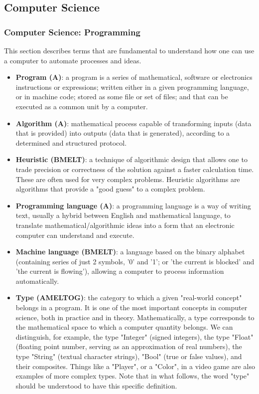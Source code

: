 \documentclass{article}
\begin{document}
\subsection*{Computer Science}

\subsubsection*{Computer Science: Programming}

This section describes terms that are fundamental to understand how one can use a computer to automate processes and ideas.

\begin{itemize}

	\item \textbf{Program (A)}: a program is a series of mathematical, software or electronics instructions or expressions; written either in a given programming language, or in machine code; stored as some file or set of files; and that can be executed as a common unit by a computer.

	\item \textbf{Algorithm (A)}: mathematical process capable of transforming inputs (data that is provided) into outputs (data that is generated), according to a determined and structured protocol.

	\item \textbf{Heuristic (BMELT)}: a technique of algorithmic design that allows one to trade precision or correctness of the solution against a faster calculation time. These are often used for very complex problems. Heuristic algorithms are algorithms that provide a "good guess" to a complex problem.

	\item \textbf{Programming language (A)}: a programming language is a way of writing text, usually a hybrid between English and mathematical language, to translate mathematical/algorithmic ideas into a form that an electronic computer can understand and execute.

	\item \textbf{Machine language (BMELT)}: a language based on the binary alphabet (containing series of just 2 symbols, '0' and '1'; or 'the current is blocked' and 'the current is flowing'), allowing a computer to process information automatically.

	\item \textbf{Type (AMELTOG)}: the category to which a given "real-world concept" belongs in a program. It is one of the most important concepts in computer science, both in practice and in theory. Mathematically, a type corresponds to the mathematical space to which a computer quantity belongs. We can distinguish, for example, the type "Integer" (signed integers), the type "Float" (floating point number, serving as an approximation of real numbers), the type "String" (textual character strings), "Bool" (true or false values), and their composites. Things like a "Player", or a "Color", in a video game are also examples of more complex types. Note that in what follows, the word "type" should be understood to have this specific definition.


\end{itemize}
\end{document}
